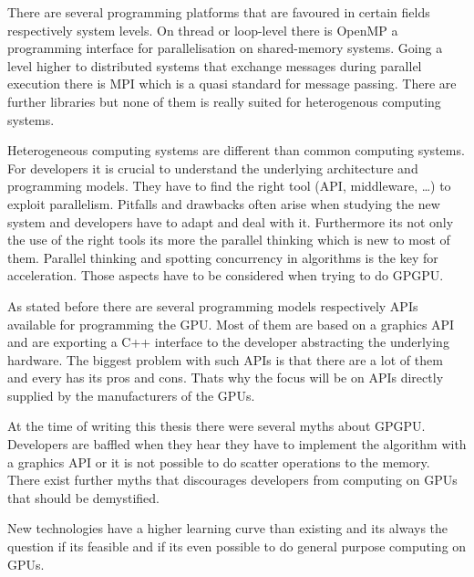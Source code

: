 
There are several programming platforms that are favoured in certain fields 
respectively system levels. On thread or loop-level there is OpenMP a programming
interface for parallelisation on shared-memory systems. Going a level higher to
distributed systems that exchange messages during parallel execution there is 
\gls{MPI} which is a quasi standard for message passing. There are further 
libraries but none of them is really suited for heterogenous computing systems.

Heterogeneous computing systems are different than common computing systems. For
developers it is crucial to understand the underlying architecture and
programming models. They have to find the right tool (\gls{API}, middleware,
\ldots) to exploit parallelism. Pitfalls and drawbacks often arise when studying
the new system and developers have to adapt and deal with it. Furthermore its
not only the use of the right tools its more the parallel thinking which is new
to most of them. Parallel thinking and spotting concurrency in algorithms is the
key for acceleration. Those aspects have to be considered when trying to do
\gls{GPGPU}.


As stated before there are several programming models respectively \glspl{API} 
available for programming the \gls{GPU}. Most of them are based on a graphics 
\gls{API} and are exporting a C++ interface to the developer abstracting
the underlying hardware. The biggest problem with such \glspl{API} is that 
there are a lot of them and every has its pros and cons. Thats why the focus
will be on \glspl{API} directly supplied by the manufacturers of the \glspl{GPU}.

At the time of writing this thesis there were several myths about \gls{GPGPU}.
Developers are baffled when they hear they have to implement the algorithm with
a graphics \gls{API} or it is not possible to do scatter operations to the memory.
There exist further myths that discourages developers from computing on
\glspl{GPU} that should be demystified. 

New technologies have a higher learning curve than existing and its always the 
question if its feasible and if its even possible to do general purpose computing
on \glspl{GPU}. 

